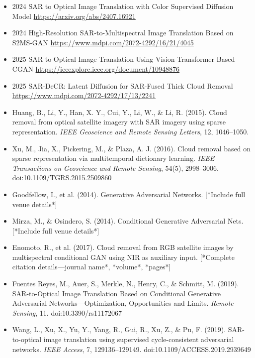 \begin{itemize}
    \item 2024  SAR to Optical Image Translation with Color Supervised Diffusion Model
    \url{https://arxiv.org/abs/2407.16921}
    
    \item 2024  High-Resolution SAR-to-Multispectral Image Translation Based on S2MS-GAN
    \url{https://www.mdpi.com/2072-4292/16/21/4045}

    \item 2025 SAR-to-Optical Image Translation Using Vision Transformer-Based CGAN
    \url{https://ieeexplore.ieee.org/document/10948876}

    \item 2025 SAR-DeCR: Latent Diffusion for SAR-Fused Thick Cloud Removal
    \url{https://www.mdpi.com/2072-4292/17/13/2241}
    

    \item Huang, B., Li, Y., Han, X. Y., Cui, Y., Li, W., & Li, R. (2015). Cloud removal from optical satellite imagery with SAR imagery using sparse representation. \textit{IEEE Geoscience and Remote Sensing Letters}, 12, 1046–1050.

    \item Xu, M., Jia, X., Pickering, M., & Plaza, A. J. (2016). Cloud removal based on sparse representation via multitemporal dictionary learning. \textit{IEEE Transactions on Geoscience and Remote Sensing}, 54(5), 2998–3006. doi:10.1109/TGRS.2015.2509860

    \item Goodfellow, I., et al. (2014). Generative Adversarial Networks. [*Include full venue details*]

    \item Mirza, M., & Osindero, S. (2014). Conditional Generative Adversarial Nets. [*Include full venue details*]

    \item Enomoto, R., et al. (2017). Cloud removal from RGB satellite images by multispectral conditional GAN using NIR as auxiliary input. [*Complete citation details—journal name*, *volume*, *pages*]

    \item Fuentes Reyes, M., Auer, S., Merkle, N., Henry, C., & Schmitt, M. (2019). SAR-to-Optical Image Translation Based on Conditional Generative Adversarial Networks—Optimization, Opportunities and Limits. \textit{Remote Sensing}, 11. doi:10.3390/rs11172067

    \item Wang, L., Xu, X., Yu, Y., Yang, R., Gui, R., Xu, Z., & Pu, F. (2019). SAR-to-optical image translation using supervised cycle-consistent adversarial networks. \textit{IEEE Access}, 7, 129136–129149. doi:10.1109/ACCESS.2019.2939649


\end{itemize}
